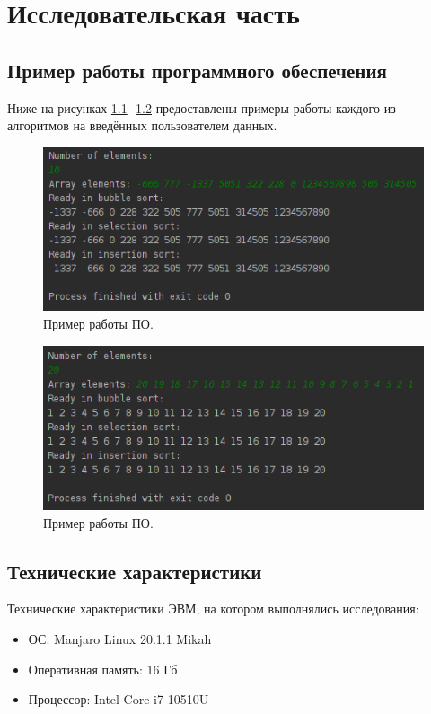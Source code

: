 \documentclass[12pt]{report}
\begin{document}
\chapter{Исследовательская часть}

\section{Пример работы программного обеспечения}
Ниже на рисунках \ref{img:exampleOut1}- \ref{img:exampleOut2} предоставлены примеры работы каждого из алгоритмов на введённых пользователем данных.

\begin{figure}
\begin{center}
\includegraphics[scale=1]{inc/img/exampleOutput.png}
\captionsetup{justification=centering}
	\caption{Пример работы ПО.}
	\label{img:exampleOut1}	
\end{center}
\end{figure}

\begin{figure}
\begin{center}
\includegraphics[scale=1]{inc/img/exampleOutput1.png}
\captionsetup{justification=centering}
	\caption{Пример работы ПО.}
	\label{img:exampleOut2}	
\end{center}
\end{figure}

\newpage

\section{Технические характеристики}
Технические характеристики ЭВМ, на котором выполнялись исследования:
\begin{itemize}
\item ОС: Manjaro Linux 20.1.1 Mikah
\item Оперативная память: 16 Гб
\item Процессор: Intel Core i7-10510U
\end{itemize}
\end{document}

